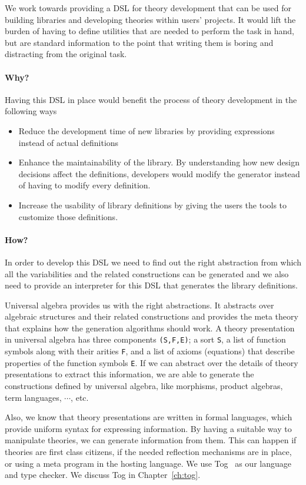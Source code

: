 We work towards providing a DSL for theory development that can be used for building libraries and developing theories within users' projects. It would lift the burden of having to define utilities that are needed to perform the task in hand, but are standard information to the point that writing them is boring and distracting from the original task. 

\paragraph{Why?}
Having this DSL in place would benefit the process of theory development in the following ways 
\begin{itemize}
    \item Reduce the development time of new libraries by providing expressions instead of actual definitions 
    \item Enhance the maintainability of the library. By understanding how new design decisions affect the definitions, developers would modify the generator instead of having to modify every definition. 
    \item Increase the usability of library definitions by giving the users the tools to customize those definitions.  
\end{itemize}  

\paragraph{How?}
In order to develop this DSL we need to find out the right abstraction from which all the variabilities and the related constructions can be generated and we also need to provide an interpreter for this DSL that generates the library definitions. 

Universal algebra provides us with the right abstractions. It abstracts over algebraic structures and their related constructions and provides the meta theory that explains how the generation algorithms should work. A theory presentation in universal algebra has three components \verb|(S,F,E)|; a sort \verb|S|, a list of function symbols along with their arities \verb|F|, and a list of axioms (equations) that describe properties of the function symbols \verb|E|. If we can abstract over the details of theory presentations to extract this information, we are able to generate the constructions defined by universal algebra, like morphisms, product algebras, term languages, $\cdots$, etc. 


Also, we know that theory presentations are written in formal languages, which provide uniform syntax for expressing information. By having a suitable way to manipulate theories, we can generate information from them. This can happen if theories are first class citizens, if the needed reflection mechanisms are in place, or using a meta program in the hosting language. We use Tog~\cite{tog} as our language and type checker. We discuss Tog in Chapter~\ref{ch:tog}. 

